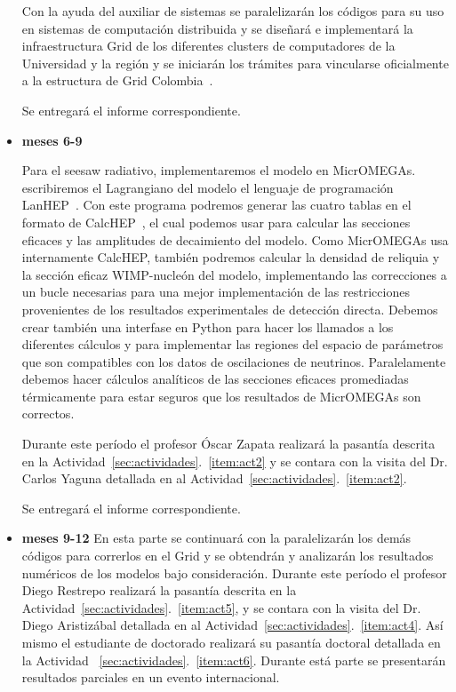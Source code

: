 \begin{itemize}
\begin{gravitinodm}
  Con la ayuda del auxiliar de sistemas se paralelizarán los códigos
  para su uso en sistemas de computación distribuida y se diseñará e
  implementará la infraestructura Grid de los diferentes clusters de
  computadores de la Universidad y la región y se iniciarán los
  trámites para vincularse oficialmente a la estructura de Grid
  Colombia~\cite{gridcolombia}.

  Se entregará el informe correspondiente.
\end{gravitinodm}

\item \textbf{meses 6-9}

\begin{darkmatter}
  Para el seesaw radiativo, implementaremos el modelo en MicrOMEGAs.
  escribiremos el Lagrangiano del modelo el lenguaje de programación
  LanHEP~\cite{Semenov:2008jy}. Con este programa podremos generar las
  cuatro tablas en el formato de CalcHEP~\cite{Pukhov:2004ca}, el cual
  podemos usar para calcular las secciones eficaces y las amplitudes
  de decaimiento del modelo.  Como MicrOMEGAs usa internamente
  CalcHEP, también podremos calcular la densidad de reliquia y la
  sección eficaz WIMP-nucleón del modelo, implementando las
  correcciones a un bucle necesarias para una mejor implementación de
  las restricciones provenientes de los resultados experimentales de
  detección directa. Debemos crear también una interfase en Python
  para hacer los llamados a los diferentes cálculos y para implementar
  las regiones del espacio de parámetros que son compatibles con los
  datos de oscilaciones de neutrinos. Paralelamente debemos hacer
  cálculos analíticos de las secciones eficaces promediadas
  térmicamente para estar seguros que los resultados de MicrOMEGAs son
  correctos.

  Durante este período el profesor Óscar Zapata realizará la pasantía
  descrita en la Actividad~\ref{sec:actividades}.~\ref{item:act2} y se
  contara con la visita del Dr. Carlos Yaguna detallada en al
  Actividad~\ref{sec:actividades}.~\ref{item:act2}.
\end{darkmatter}

  Se entregará el informe correspondiente.

\item \textbf{meses 9-12} En esta parte se continuará con la
  paralelizarán los demás códigos para correrlos en el Grid y se
  obtendrán y analizarán los resultados numéricos de los modelos bajo
  consideración.  Durante este período el profesor Diego Restrepo
  realizará la pasantía descrita en la
  Actividad~\ref{sec:actividades}.~\ref{item:act5}, y se
  contara con la visita del Dr. Diego Aristizábal detallada en al
  Actividad~\ref{sec:actividades}.~\ref{item:act4}. Así mismo el
  estudiante de doctorado realizará su pasantía doctoral detallada en
  la Actividad ~\ref{sec:actividades}.~\ref{item:act6}. Durante está
  parte se presentarán resultados parciales en un evento
  internacional.


\end{itemize}
